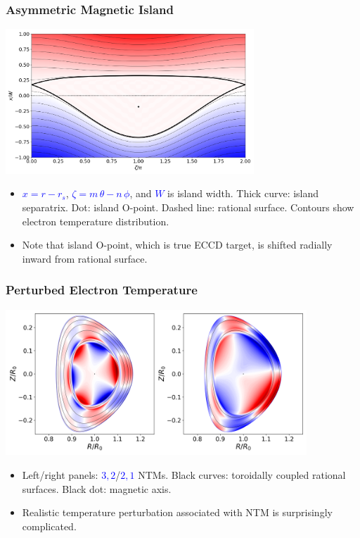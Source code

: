 \documentclass{beamer}
\begin{document}
\begin{frame}
\frametitle{Asymmetric Magnetic Island}
 
\begin{center}
\includegraphics[width=0.7\textwidth]{../Fig7.png}
\end{center}
\begin{itemize}
\item \textcolor{blue}{$x=r-r_s$}, \textcolor{blue}{$\zeta = m\,\theta-n\,\phi$}, and \textcolor{blue}{$W$} is island width. Thick curve: island separatrix. Dot: island O-point. Dashed line: 
rational surface. Contours show electron temperature distribution.
\item Note that island O-point, which is true ECCD target, is shifted radially inward from rational surface. 
\end{itemize}
\end{frame}

\begin{frame}
\frametitle{Perturbed Electron Temperature}
 
\begin{center}
\includegraphics[width=0.85\textwidth]{../Fig13.png}
\end{center}
\begin{itemize}
\item Left/right panels: \textcolor{blue}{$3,2$}/\textcolor{blue}{$2,1$} NTMs. Black curves: toroidally coupled rational surfaces. Black dot: magnetic axis. 
\item Realistic temperature perturbation associated with NTM is surprisingly complicated.   
\end{itemize}
\end{frame}
\end{document}
